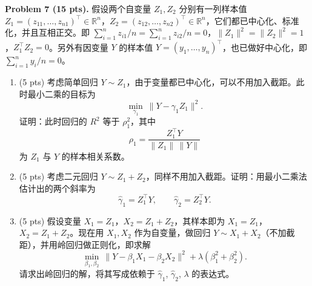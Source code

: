 \documentclass[11pt]{ctexart}
\begin{document}
\noindent\textbf{Problem 7 (15 pts).} 假设两个自变量 $Z_1, Z_2$ 分别有一列样本值 $Z_1 = (z_{11}, \ldots, z_{n1})^{\top} \in \mathbb{R}^n$，$Z_2 = (z_{12}, \ldots, z_{n2})^{\top} \in \mathbb{R}^n$，它们都已中心化、标准化，并且互相正交。即 $\sum_{i=1}^n z_{i1}/n = \sum_{i=1}^n z_{i2}/n = 0$，$\|Z_1\|^2 = \|Z_2\|^2 = 1$，$Z_1^{\top}Z_2 = 0$。另外有因变量 $Y$ 的样本值 $Y = (y_1, \ldots, y_n)^{\top}$，也已做好中心化，即 $\sum_{i=1}^n y_i/n = 0$。
\begin{enumerate}
\item (5 pts) 考虑简单回归 $Y \sim Z_1$，由于变量都已中心化，可以不用加入截距。此时最小二乘的目标为
\[
\min_{\gamma_1}\ \|Y - \gamma_1 Z_1\|^2.
\]
证明：此时回归的 $R^2$ 等于 $\rho_1^2$，其中
\[
\rho_1 = \frac{Z_1^{\top}Y}{\|Z_1\|\,\|Y\|}
\]
为 $Z_1$ 与 $Y$ 的样本相关系数。
\item (5 pts) 考虑二元回归 $Y \sim Z_1 + Z_2$，同样不用加入截距。证明：用最小二乘法估计出的两个斜率为
\[
\hat{\gamma}_1 = Z_1^{\top}Y, \qquad \hat{\gamma}_2 = Z_2^{\top}Y.
\]
\item (5 pts) 假设变量 $X_1 = Z_1$，$X_2 = Z_1 + Z_2$，其样本即为 $X_1 = Z_1$，$X_2 = Z_1 + Z_2$。现在用 $X_1, X_2$ 作为自变量，做回归 $Y \sim X_1 + X_2$（不加截距），并用岭回归做正则化，即求解
\[
\min_{\beta_1, \beta_2}\ \|Y - \beta_1 X_1 - \beta_2 X_2\|^2 + \lambda\left(\beta_1^2 + \beta_2^2\right).
\]
请求出岭回归的解，将其写成依赖于 $\hat{\gamma}_1$, $\hat{\gamma}_2$, $\lambda$ 的表达式。
\end{enumerate}
\end{document}
